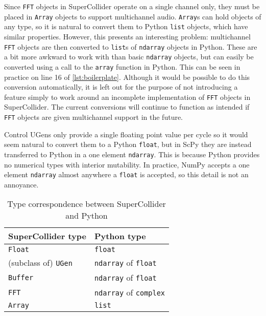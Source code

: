\documentclass{article}
\begin{document}
Since \texttt{FFT} objects in SuperCollider operate on a single channel only, they must be placed
in \texttt{Array} objects to support multichannel audio. \texttt{Array}s can hold objects of any
type, so it is natural to convert them to Python \texttt{list} objects, which have similar
properties. However, this presents an interesting problem: multichannel \texttt{FFT} objects are
then converted to \texttt{list}s of \texttt{ndarray} objects in Python. These are a bit more
awkward to work with than basic \texttt{ndarray} objects, but can easily be converted using a call
to the \texttt{array} function in Python. This can be seen in practice on line 16 of
\autoref{lst:boilerplate}. Although it would be possible to do this conversion
automatically, it is left out for the purpose of not introducing a feature simply to work around an
incomplete implementation of \texttt{FFT} objects in SuperCollider. The current conversions will
continue to function as intended if \texttt{FFT} objects are given multichannel support in the
future.

Control UGens only provide a single floating point value per cycle so it would seem natural to
convert them to a Python \texttt{float}, but in ScPy they are instead transferred to Python in a
one element \texttt{ndarray}. This is because Python provides no numerical types with interior
mutability. In practice, NumPy accepts a one element \texttt{ndarray} almost anywhere a
\texttt{float} is accepted, so this detail is not an annoyance.

\begin{table}[ht]
    \caption{Type correspondence between SuperCollider and Python}
    \begin{center}
        \begin{tabular}{ll}
            \toprule
            SuperCollider type & Python type \\
            \midrule
            \texttt{Float} & \texttt{float} \\
            (subclass of) \texttt{UGen} & \texttt{ndarray} of \texttt{float} \\
            \texttt{Buffer} & \texttt{ndarray} of \texttt{float} \\
            \texttt{FFT} & \texttt{ndarray} of \texttt{complex} \\
            \texttt{Array} & \texttt{list} \\
            \bottomrule
        \end{tabular}
    \end{center}
\end{table}
\end{document}
